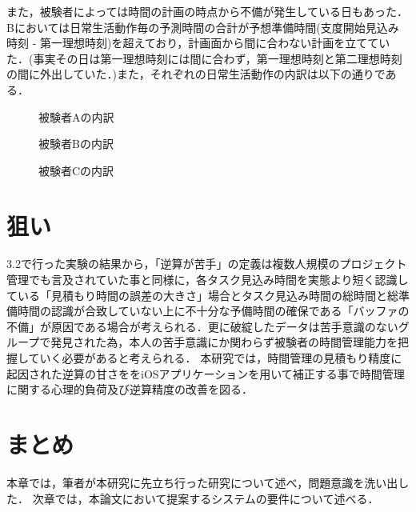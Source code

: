また，被験者によっては時間の計画の時点から不備が発生している日もあった．Bにおいては日常生活動作毎の予測時間の合計が予想準備時間(支度開始見込み時刻 - 第一理想時刻)を超えており，計画面から間に合わない計画を立てていた．(事実その日は第一理想時刻には間に合わず，第一理想時刻と第二理想時刻の間に外出していた．)また，それぞれの日常生活動作の内訳は以下の通りである．

\begin{figure}[hb]
	\begin{center}
		\caption{被験者Aの内訳}
		\label{fig:top_point}
	\end{center}
\end{figure}

\begin{figure}[hb]
	\begin{center}
		\caption{被験者Bの内訳}
		\label{fig:top_point}
	\end{center}
\end{figure}

\begin{figure}[hb]
	\begin{center}
		\caption{被験者Cの内訳}
		\label{fig:top_point}
	\end{center}
\end{figure}

\section{狙い}
3.2で行った実験の結果から，「逆算が苦手」の定義は複数人規模のプロジェクト管理でも言及されていた事と同様に，各タスク見込み時間を実態より短く認識している「見積もり時間の誤差の大きさ」場合とタスク見込み時間の総時間と総準備時間の認識が合致していない上に不十分な予備時間の確保である「バッファの不備」が原因である場合が考えられる．更に破綻したデータは苦手意識のないグループで発見された為，本人の苦手意識にか関わらず被験者の時間管理能力を把握していく必要があると考えられる．
本研究では，時間管理の見積もり精度に起因された逆算の甘さををiOSアプリケーションを用いて補正する事で時間管理に関する心理的負荷及び逆算精度の改善を図る．

\section{まとめ}
本章では，筆者が本研究に先立ち行った研究について述べ，問題意識を洗い出した．
次章では，本論文において提案するシステムの要件について述べる．